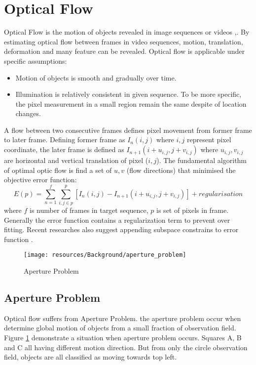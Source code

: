 \section{Optical Flow}
\label{sec:bg_opticalflow}
Optical Flow is the motion of objects revealed in image sequences or videos \cite{fleet2006optical},\cite{Sun2010}. By estimating optical flow between frames in video sequences, motion, translation, deformation and many feature can be revealed. Optical flow is applicable under specific assumptions:
\begin{itemize}
  \item Motion of objects is smooth and gradually over time.
  \item Illumination is relatively consistent in given sequence. To be more specific, the pixel measurement in a small region remain the same despite of location changes.
\end{itemize}
A flow between two consecutive frames defines pixel movement from former frame to later frame. Defining former frame as \(I_n(i,j)\) where \(i,j\) represent pixel coordinate, the later frame is defined as \(I_{n+1}(i+u_{i,j},j+v_{i,j})\) where \(u_{i,j},v_{i,j}\) are horizontal and vertical translation of pixel (\(i,j\)). The fundamental algorithm of optimal optic flow is find a set of $u, v$ (flow directions) that minimised the objective error function:
\begin{equation}
E(p)=\sum^f_{n=1}\sum^{p}_{i,j\in p}[I_n(i,j)-I_{n+1}(i+u_{i,j},j+v_{i,j})]+regularisation
\end{equation}
where $f$ is number of frames in target sequence, $p$ is set of pixels in frame. Generally the error function contains a regularization term to prevent over fitting. Recent researches also suggest appending subspace constrains to error function \cite{Garg2013, Garg, Garg2013a}. 

\begin{figure}[ht]
\centering
\texttt{[image: resources/Background/aperture\_problem]}
\caption{Aperture Problem}
\label{fig:aperture_problem}
\end{figure}

\subsection{Aperture Problem}

Optical flow suffers from Aperture Problem. the aperture problem occur when determine global motion of objects from a small fraction of observation field. Figure \ref{fig:aperture_problem} demonstrate a situation when aperture problem occurs. Squares A, B and C all having different motion direction. But from only the circle observation field, objects are all classified as moving towards top left.

